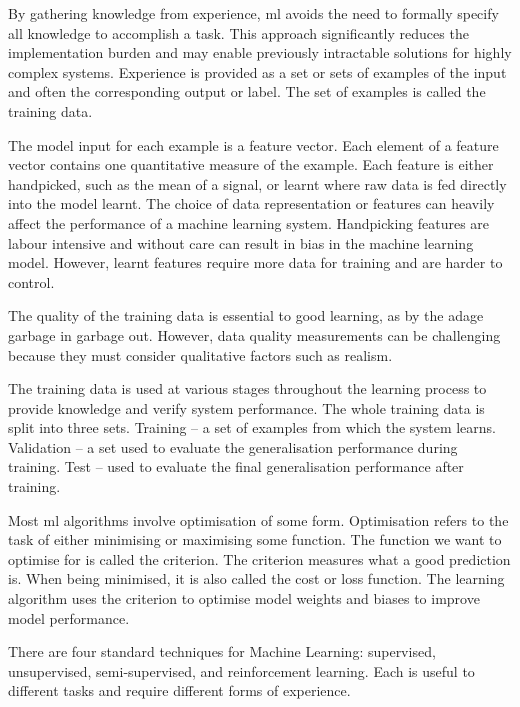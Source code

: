 By gathering knowledge from experience, \acrshort{ml} avoids the need to formally specify all knowledge to accomplish a task\cite{Goodfellow2015}. This approach significantly reduces the implementation burden and may enable previously intractable solutions for highly complex systems. Experience is provided as a set or sets of examples of the input and often the corresponding output or label. The set of examples is called the training data.

The model input for each example is a feature vector. Each element of a feature vector contains one quantitative measure of the example. Each feature is either handpicked, such as the mean of a signal, or learnt where raw data is fed directly into the model learnt. The choice of data representation or features can heavily affect the performance of a machine learning system. Handpicking features are labour intensive and without care can result in bias in the machine learning model. However, learnt features require more data for training and are harder to control.\cite{Bengio2013}

The quality of the training data is essential to good learning, as by the adage garbage in garbage out. However, data quality measurements can be challenging because they must consider qualitative factors such as realism.

The training data is used at various stages throughout the learning process to provide knowledge and verify system performance. The whole training data is split into three sets. Training – a set of examples from which the system learns. Validation – a set used to evaluate the generalisation performance during training. Test – used to evaluate the final generalisation performance after training. 

Most \acrshort{ml} algorithms involve optimisation of some form. Optimisation refers to the task of either minimising or maximising some function. The function we want to optimise for is called the criterion. The criterion measures what a good prediction is. When being minimised, it is also called the cost or loss function.\cite{Goodfellow2015} The learning algorithm uses the criterion to optimise model weights and biases to improve model performance.

There are four standard techniques for Machine Learning: supervised, unsupervised, semi-supervised, and reinforcement learning. Each is useful to different tasks and require different forms of experience.

